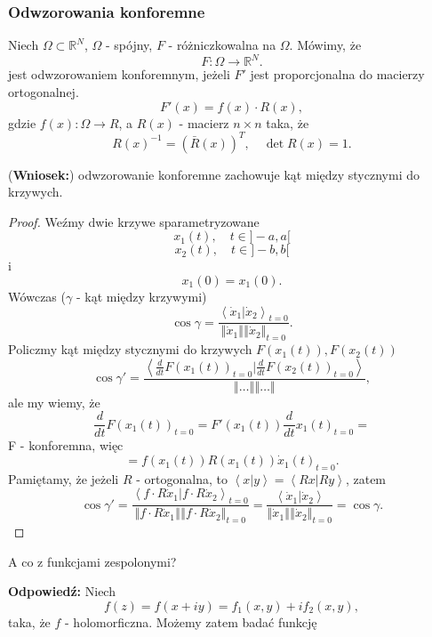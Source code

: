 \documentclass[../main.tex]{subfiles}
\begin{document}
    \subsubsection{Odwzorowania konforemne}
    \begin{definicja}
        Niech $\Omega \subset\mathbb{R}^N$, $\Omega$ - spójny, $F$ - różniczkowalna na $\Omega$. Mówimy, że
        \[
        F : \Omega \to \mathbb{R}^N
        .\]
    jest odwzorowaniem konforemnym, jeżeli $F'$ jest proporcjonalna do macierzy ortogonalnej.
    \[
        F'(x) = f(x) \cdot R(x)
    ,\]
gdzie $f(x) : \Omega \to R$, a $R(x)$ - macierz  $n\times n$ taka, że
 \[
     R(x)^{-1} = \left( \bar{R}(x) \right) ^T,\quad \det R(x) = 1
.\]
    \end{definicja}
    \begin{stw}
        (\textbf{Wniosek:}) odwzorowanie konforemne zachowuje kąt między stycznymi do krzywych.
    \end{stw}
    \begin{proof}
Weźmy dwie krzywe sparametryzowane
\[
    x_1(t),\quad t\in ]-a,a[
\]
\[
    x_2(t),\quad t\in ]-b,b[
\]
        i
        \[
            x_1(0) = x_1(0).
        \]
        Wówczas ($\gamma$ - kąt między krzywymi)
        \[
            \cos\gamma = \frac{\left<\dot{x}_1 | \dot{x}_2 \right>_{t=0}}{\left\Vert \dot{x}_1 \right\Vert \left\Vert \dot{x}_2 \right\Vert _{t=0}}
        .\]
    Policzmy kąt między stycznymi do krzywych $F(x_1(t)), F(x_2(t))$
    \[
        \cos\gamma' = \frac{\left<\frac{d}{dt}F(x_1(t))_{t=0} | \frac{d}{dt}F(x_2(t))_{t=0} \right>}{\left\Vert \ldots \right\Vert \left\Vert \ldots \right\Vert }
    ,\]
ale my wiemy, że
 \[
     \frac{d}{dt}F(x_1(t))_{t=0} = F'(x_1(t)) \frac{d}{dt}x_1(t)_{t=0}=
\]
F - konforemna, więc
\[
    = f(x_1(t))R(x_1(t))\dot{x}_1(t)_{t=0}
.\]
Pamiętamy, że jeżeli $R$ - ortogonalna, to $\left<x|y \right> = \left<Rx|Ry \right>$, zatem
\[
    \cos\gamma' = \frac{\left<f\cdot R\dot{x}_1 | f\cdot R\dot{x}_2 \right>_{t=0}}{\left\Vert f\cdot R\dot{x}_1 \right\Vert \left\Vert f\cdot R \dot{x}_2 \right\Vert_{t=0} } =
        \frac{\left<\dot{x}_1 | \dot{x}_2 \right>}{\left\Vert \dot{x}_1 \right\Vert \left\Vert \dot{x}_2 \right\Vert _{t=0}} = \cos\gamma
.\]
    \end{proof}
    \begin{pytanie}
        A co z funkcjami zespolonymi?
    \end{pytanie}
    \textbf{Odpowiedź: }Niech
    \[
        f(z) = f(x + iy) = f_1(x,y) + if_2(x,y)
    ,\]
taka, że $f$ - holomorficzna. Możemy zatem badać funkcję
\end{document}
